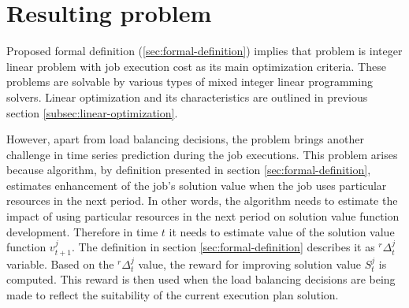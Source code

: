 \section{Resulting problem}\label{sec:resulting-problem}
Proposed formal definition (\ref{sec:formal-definition}) implies that problem is 
integer linear problem with job execution cost as its main optimization criteria. 
These problems are solvable by various types of mixed integer linear programming solvers.
Linear optimization and its characteristics are outlined in previous section \ref{subsec:linear-optimization}.

However,
apart from load balancing decisions,
the problem brings another challenge in time series prediction during the job executions.
This problem arises because algorithm, by definition presented in section \ref{sec:formal-definition},
estimates enhancement of the job's solution value when the job uses particular resources in the next period.
In other words, 
the algorithm needs to estimate the impact of using particular resources in the next period on solution value function development.
Therefore in time $t$ it needs to estimate value of the solution value function $v_{t+1}^{j}$.
The definition in section \ref{sec:formal-definition} describes it as $^{r}\Delta_{t}^{j}$ variable.
Based on the $^{r}\Delta_{t}^{j}$ value, the reward for improving solution value $S_{t}^{j}$ is computed.
This reward is then used when the load balancing decisions are being made to reflect the suitability of the current execution plan solution.